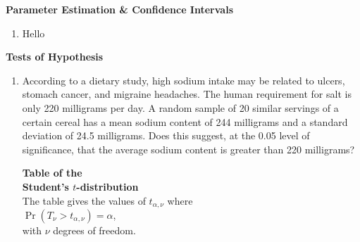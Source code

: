 \documentclass[12pt,a4paper]{article}
\newcommand{\subtopic}[2]{%
  \vspace{10pt}
  \noindent\begin{tcolorbox}[colback=#1!8,colframe=#1,boxrule=0.6pt,arc=4pt,
    left=6pt,right=6pt,top=4pt,bottom=4pt]
    \small\bfseries\textcolor{#1}{#2}
  \end{tcolorbox}
  \vspace{2pt}
}
\begin{document}
\subtopic{cG}{Parameter Estimation \& Confidence Intervals}
\label{sub:s9-estimation}

\begin{enumerate}
\item Hello \end{enumerate}

\subtopic{cG}{Tests of Hypothesis}
\label{sub:s9-hypothesis}

\begin{enumerate}

\item According to a dietary study, high sodium intake may be related to ulcers, stomach cancer, and migraine headaches. The human requirement for salt is only 220 milligrams per day. A random sample of 20 similar servings of a certain cereal has a mean sodium content of 244 milligrams and a standard deviation of 24.5 milligrams. Does this suggest, at the 0.05 level of significance, that the average sodium content is greater than 220 milligrams?

\begin{center}
\begin{minipage}{0.45\textwidth}
    \centering
    \textbf{\large Table of the} \\
    \vspace{0.2cm}
    \textbf{\large Student's $t$-distribution} \\
    \vspace{0.4cm}
    The table gives the values of $t_{\alpha, \nu}$ where \\
    $\Pr(T_\nu > t_{\alpha, \nu}) = \alpha$, \\
    with $\nu$ degrees of freedom.
\end{minipage}
\hfill
\begin{minipage}{0.45\textwidth}
    \centering
\end{minipage}
\end{center}
\end{enumerate}
\end{document}
